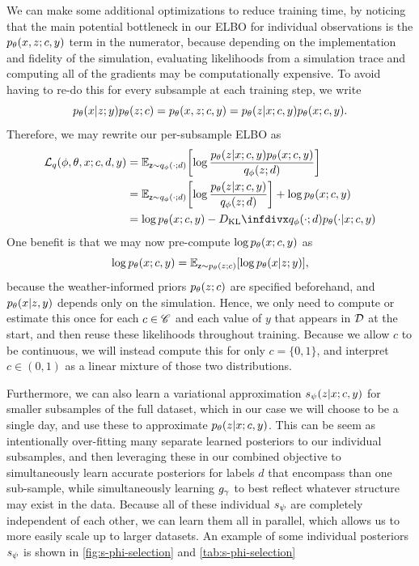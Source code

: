 We can make some additional optimizations to reduce training time, by noticing that the main potential bottleneck in our ELBO for individual observations is the $\pld{x,z;c,y}$ term in the numerator, because depending on the implementation and fidelity of the simulation, evaluating likelihoods from a simulation trace and computing all of the gradients may be computationally expensive. To avoid having to re-do this for every subsample at each training step, we write
\begin{equation}
    \pld{x\given z;y}\pld{z;c} = \pld{x,z;c,y} = \pld{z\given x;c,y}\pld{x;c,y}.
\end{equation}
Therefore, we may rewrite our per-subsample ELBO as
\begin{align}
    \elbo{q}{\phi, \theta, x ; c,d,y} &= \EX{\rz \sim \qvd{\cdot ;d} }{ \log\frac{\pld{z\given x;c,y}\pld{x;c,y} }{\qvd{z; d}}} \\
    &=\EX{\rz \sim \qvd{\cdot ; d} }{ \log\frac{\pld{z\given x;c,y} }{\qvd{z; d}}} +\log \pld{x;c,y}\\
    &= \log \pld{x;c,y} - \DKL{\qvd{\cdot ; d}}{\pld{\cdot \given x;c,y}}
\end{align}
One benefit is that we may now pre-compute $\log \pld{x;c,y}$ as
\begin{equation}
    \log \pld{x;c,y} = \EX{\rz \sim \pld{z;c}}{\log \pld{x\given z;y}},
\end{equation}
because the weather-informed priors $\pld{z;c}$ are specified beforehand, and $\pld{x\given z,y}$ depends only on the simulation. Hence, we only need to compute or estimate this once for each $c\in\mathscr{C}$ and each value of $y$ that appears in $\mathcal D$ at the start, and then reuse these likelihoods throughout training. Because we allow $c$ to be continuous, we will instead compute this for only $c=\{0,1\}$, and interpret $c\in(0,1)$ as a linear mixture of those two distributions.

Furthermore, we can also learn a variational approximation $\svd{z\given x;c,y}$ for smaller subsamples of the full dataset, which in our case we will choose to be a single day, and use these to approximate $\pld{z\given x;c,y}$. This can be seem as intentionally over-fitting many separate learned posteriors to our individual subsamples, and then leveraging these in our combined objective to simultaneously learn accurate posteriors for labels $d$ that encompass than one sub-sample, while simultaneously learning $g_{\gamma}$ to best reflect whatever structure may exist in the data. Because all of these individual $s_{\psi}$ are completely independent of each other, we can learn them all in parallel, which allows us to more easily scale up to larger datasets. An example of some individual posteriors $s_{\psi}$ is shown in \cref{fig:s-phi-selection} and \cref{tab:s-phi-selection}

